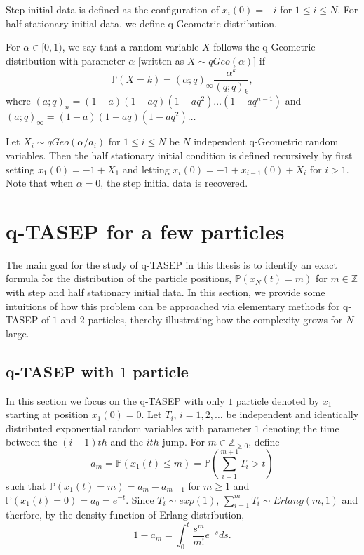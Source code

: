 Step initial data is defined as the configuration of $x_i(0) = -i$ for $1 \le i \le N$. For half stationary initial data, we define q-Geometric distribution. 

\begin{definition}
\label{def:qgeo}
For $\alpha \in [0,1)$, we say that a random variable $X$ follows the q-Geometric distribution with parameter $\alpha$ [written as $X \sim qGeo(\alpha)$] if $$\mathbb{P}(X = k) = (\alpha;q)_{\infty} \frac{\alpha^k}{(q;q)_k},$$ where $(a;q)_n = (1-a)(1-aq)(1-aq^2)\dots(1-aq^{n-1})$ and $(a;q)_{\infty} = (1-a)(1-aq)(1-aq^2)\dots$
\end{definition}

Let $X_i \sim qGeo(\alpha/a_i)$ for $1 \le i \le N$ be $N$ independent q-Geometric random variables. Then the half stationary initial condition is defined recursively by first setting $x_1(0) = -1 + X_1$ and letting $x_i(0) = -1 + x_{i-1}(0) + X_i$ for $i > 1$. Note that when $\alpha = 0$, the step initial data is recovered.

\section{q-TASEP for a few particles}
The main goal for the study of q-TASEP in this thesis is to identify an exact formula for the distribution of the particle positions, $\mathbb{P}(x_N(t) = m)$ for $m \in \mathbb{Z}$ with step and half stationary initial data. In this section, we provide some intuitions of how this problem can be approached via elementary methods for q-TASEP of $1$ and $2$ particles, thereby illustrating how the complexity grows for $N$ large. 

\subsection{q-TASEP with $1$ particle}
In this section we focus on the q-TASEP with only $1$ particle denoted by $x_1$ starting at position $x_1(0) = 0$. Let $T_i$, $i = 1,2,\dots$ be independent and identically distributed exponential random variables with parameter $1$ denoting the time between the $(i-1)th$ and the $ith$ jump. For $m \in \mathbb{Z}_{\ge 0}$, define $$a_m = \mathbb{P}(x_1(t) \le m) = \mathbb{P}(\sum_{i=1}^{m+1} T_i > t)$$ such that $\mathbb{P}(x_1(t) = m) = a_m - a_{m-1}$ for $m \ge 1$ and $\mathbb{P}(x_1(t) = 0) = a_0 = e^{-t}$. Since $T_i \sim exp(1)$, $\sum_{i=1}^{m} T_i \sim Erlang(m,1)$ and therfore, by the density function of Erlang distribution, $$1 - a_m = \int_0^t \frac{s^m}{m!} e^{-s} ds.$$ 

